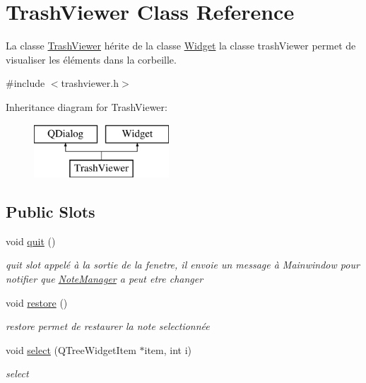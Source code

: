 \hypertarget{classTrashViewer}{}\section{Trash\+Viewer Class Reference}
\label{classTrashViewer}


La classe \hyperlink{classTrashViewer}{Trash\+Viewer} hérite de la classe \hyperlink{classWidget}{Widget} la classe trash\+Viewer permet de visualiser les éléments dans la corbeille.  




{\ttfamily \#include $<$trashviewer.\+h$>$}

Inheritance diagram for Trash\+Viewer\+:\begin{figure}[H]
\begin{center}
\leavevmode
\includegraphics[height=2.000000cm]{classTrashViewer}
\end{center}
\end{figure}
\subsection*{Public Slots}
\begin{DoxyCompactItemize}
\item 
\mbox{\label{classTrashViewer_af0a0aff3c6455da8c4129342ab5a7a5f}} 
void \hyperlink{classTrashViewer_af0a0aff3c6455da8c4129342ab5a7a5f}{quit} ()
\begin{DoxyCompactList}\small\item\em quit slot appelé à la sortie de la fenetre, il envoie un message à Mainwindow pour notifier que \hyperlink{classNoteManager}{Note\+Manager} a peut etre changer \end{DoxyCompactList}\item 
\mbox{\label{classTrashViewer_a2d393e2eb2606e0e7dc20b5a3ffbd3f2}} 
void \hyperlink{classTrashViewer_a2d393e2eb2606e0e7dc20b5a3ffbd3f2}{restore} ()
\begin{DoxyCompactList}\small\item\em restore permet de restaurer la note selectionnée \end{DoxyCompactList}\item 
void \hyperlink{classTrashViewer_aa5bef46480167fc713a7f6044c14873f}{select} (Q\+Tree\+Widget\+Item $\ast$item, int i)
\begin{DoxyCompactList}\small\item\em select \end{DoxyCompactList}\end{DoxyCompactItemize}
